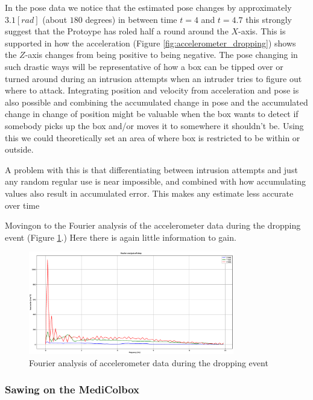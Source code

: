 \documentclass[../main.tex]{subfiles}
\begin{document}
In the pose data we notice that the estimated pose changes by approximately $3.1 [rad]$ (about $180$ degrees) in between time $t=4$ and $t=4.7$ this strongly suggest that the Protoype has roled half a round around the $X$-axis. This is supported in how the acceleration (Figure \ref{fig:accelerometer_dropping}) shows the $Z$-axis changes from being positive to being negative.
The pose changing in such drastic ways will be representative of how a box can be tipped over or turned around during an intrusion attempts when an intruder tries to figure out where to attack. Integrating position and velocity from acceleration and pose is also possible and combining the accumulated change in pose and the accumulated change in change of position might be valuable when the box wants to detect if somebody picks up the box and/or moves it to somewhere it shouldn't be. Using this we could theoretically set an area of where box is restricted to be within or outside.

A problem with this is that differentiating between intrusion attempts and just any random regular use is near impossible, and combined with how accumulating values also result in accumulated error. This makes any estimate less accurate over time


Movingon to the Fourier analysis of the accelerometer data during the
dropping event (Figure \ref{fig:fourier_accelerometer_dropping}.)
Here there is again little information to gain.

\begin{figure}[htbp]
    \centering
    \includegraphics[width=0.8\textwidth]{resources/figures/Fourier_acceleration_drop.eps}
    \caption{Fourier analysis of accelerometer data during the dropping event}
    \label{fig:fourier_accelerometer_dropping}
\end{figure}

\clearpage

\subsubsection{Sawing on the MediColbox}
\end{document}
